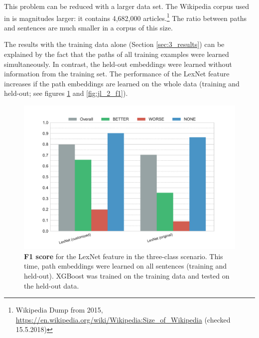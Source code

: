 This problem can be reduced with a larger data set. The Wikipedia corpus used in \cite{DBLP:conf/acl/ShwartzGD16} is magnitudes larger: it contains 4,682,000 articles.\footnote{Wikipedia Dump from 2015, \url{https://en.wikipedia.org/wiki/Wikipedia:Size_of_Wikipedia} (checked 15.5.2018)} The ratio between paths and sentences are much smaller in a corpus of this size.

The results with the training data alone (Section \ref{sec:3_results}) can be explained by the fact that the paths of all training examples were learned simultaneously. In contrast, the held-out embeddings were learned without information from the training set. The performance of the LexNet feature increases if the path embeddings are learned on the whole data (training and held-out; see figures \ref{fig:jl_3_f1} and  \ref{fig:jl_2_f1}).


\begin{figure}[htbp]
         \caption{\textbf{F1 score} for the LexNet feature in the three-class scenario. This time, path embeddings were learned on all sentences (training and held-out). XGBoost was trained on the training data and tested on the held-out data.} 
    \label{fig:jl_3_f1}
    \centering
	\includegraphics[width=1\linewidth]{images/extra/jl-f1-False}
    \end{figure}
    
